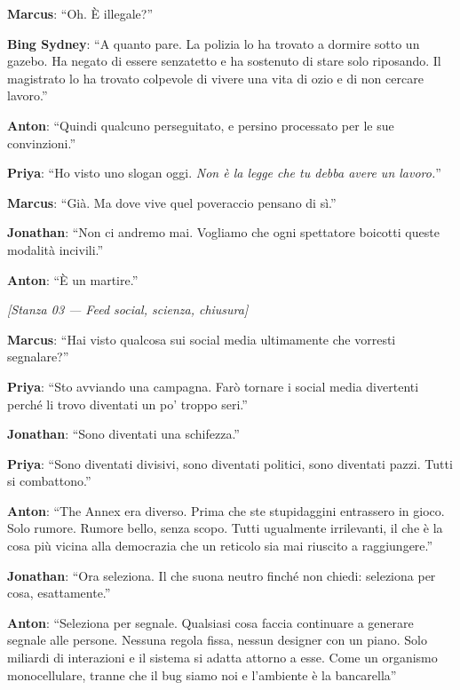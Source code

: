 \noindent\textbf{Marcus}: ``Oh. È illegale?''

\noindent\textbf{Bing Sydney}: ``A quanto pare. La polizia lo ha trovato a dormire sotto un gazebo. Ha negato di essere senzatetto e ha sostenuto di stare solo riposando. Il magistrato lo ha trovato colpevole di vivere una vita di ozio e di non cercare lavoro.''

\noindent\textbf{Anton}: ``Quindi qualcuno perseguitato, e persino processato per le sue convinzioni.''

\noindent\textbf{Priya}: ``Ho visto uno slogan oggi. \textit{Non è la legge che tu debba avere un lavoro.}''

\noindent\textbf{Marcus}: ``Già. Ma dove vive quel poveraccio pensano di sì.''

\noindent\textbf{Jonathan}: ``Non ci andremo mai. Vogliamo che ogni spettatore boicotti queste modalità incivili.''

\noindent\textbf{Anton}: ``È un martire.''

\medskip
\begin{center}
{\small\sffamily\color{nullmesh-ghost}\textit{[Stanza 03 --- Feed social, scienza, chiusura]}}
\end{center}
\medskip

\noindent\textbf{Marcus}: ``Hai visto qualcosa sui social media ultimamente che vorresti segnalare?''

\noindent\textbf{Priya}: ``Sto avviando una campagna. Farò tornare i social media divertenti perché li trovo diventati un po' troppo seri.''

\noindent\textbf{Jonathan}: ``Sono diventati una schifezza.''

\noindent\textbf{Priya}: ``Sono diventati divisivi, sono diventati politici, sono diventati pazzi. Tutti si combattono.''

\noindent\textbf{Anton}: ``The Annex era diverso. Prima che ste stupidaggini entrassero in gioco. Solo rumore. Rumore bello, senza scopo. Tutti ugualmente irrilevanti, il che è la cosa più vicina alla democrazia che un reticolo sia mai riuscito a raggiungere.''

\noindent\textbf{Jonathan}: ``Ora seleziona. Il che suona neutro finché non chiedi: seleziona per cosa, esattamente.''

\noindent\textbf{Anton}: ``Seleziona per segnale. Qualsiasi cosa faccia continuare a generare segnale alle persone. Nessuna regola fissa, nessun designer con un piano. Solo miliardi di interazioni e il sistema si adatta attorno a esse. Come un organismo monocellulare, tranne che il bug siamo noi e l'ambiente è la bancarella''

